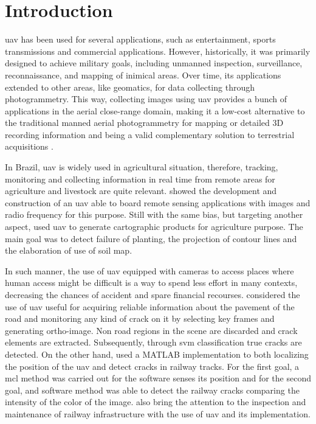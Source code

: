 \chapter[Introduction]{Introduction}\label{cha:intro}

\gls*{uav} has been used for several applications, such as entertainment, sports transmissions and commercial applications.
However, historically, it was primarily designed to achieve military goals, including unmanned inspection, surveillance, reconnaissance, and mapping of inimical areas.
Over time, its applications extended to other areas, like geomatics, for data collecting through photogrammetry. 
This way, collecting images using \gls*{uav} provides a bunch of applications in the aerial close-range domain, making it a low-cost alternative to the traditional manned aerial photogrammetry for mapping or detailed 3D recording information and being a valid complementary solution to terrestrial acquisitions \citep{nex_uav_2014}.

In Brazil, \gls*{uav} is widely used in agricultural situation, therefore, tracking, monitoring and collecting information in real time from remote areas for agriculture and livestock are quite relevant. 
\citet{abade_construcao_nodate} showed the development and construction of an \gls*{uav} able to board remote sensing applications with images and radio frequency for this purpose. 
Still with the same bias, but targeting another aspect, \citet{otake_produtos_nodate} used \gls*{uav} to generate cartographic products for agriculture purpose. 
The main goal was to detect failure of planting, the projection of contour lines and the elaboration of use of soil map.

In such manner, the use of \gls*{uav} equipped with cameras to access places where human access might be difficult is a way to spend less effort in many contexts, decreasing the chances of accident and spare financial recourses.
\citet{dadrasjavan_automatic_2019} considered the use of \gls*{uav} useful for acquiring reliable information about the pavement of the road and monitoring any kind of crack on it by selecting key frames and generating ortho-image.
Non road regions in the scene are discarded and crack elements are extracted.
Subsequently, through \gls*{svm} classification true cracks are detected. 
On the other hand, \citet{sushant_localization_2017} used a MATLAB\textsuperscript{\textregistered} implementation to both localizing the position of the \gls*{uav} and detect cracks in railway tracks. For the first goal, a \gls*{mcl} method was carried out for the software senses its position and for the second goal, and software method was able to detect the railway cracks comparing the intensity of the color of the image. \citet{lesiak_inspection_2020} also bring the attention to the inspection and
maintenance of railway infrastructure with the use of \gls*{uav} and its implementation.

